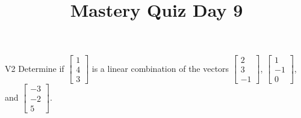 \documentclass{sbgLAquiz}
\title{Mastery Quiz Day 9 }
\begin{document}
\begin{problem}{V2}
Determine if $\begin{bmatrix} 1 \\ 4 \\ 3 \end{bmatrix}$ is a linear combination of the vectors $\begin{bmatrix} 2 \\ 3 \\ -1 \end{bmatrix}$, $\begin{bmatrix} 1 \\ -1 \\ 0 \end{bmatrix}$, and $\begin{bmatrix} -3 \\ -2 \\ 5 \end{bmatrix}$.
\end{problem}
\end{document}
